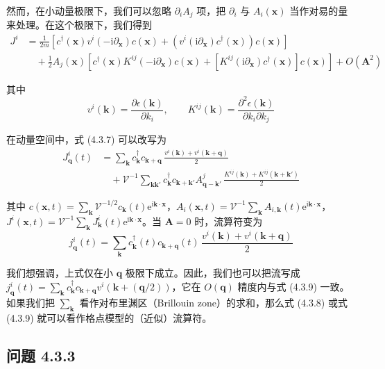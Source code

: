 然而，在小动量极限下，我们可以忽略 $\partial_iA_j$ 项，把 $\partial_i$ 与 $A_i(\pmb{x})$ 当作对易的量来处理。在这个极限下，我们得到
\begin{align*}
J^i &= \frac{1}{2m}\left[c^{\dagger}(\pmb{x})v^i(-\mathrm{i}\partial_{\pmb{x}})c(\pmb{x}) + \left(v^i(\mathrm{i}\partial_{\pmb{x}})c^{\dagger}(\pmb{x})\right)c(\pmb{x})\right] \tag{4.3.7}\\
&\quad + \frac{1}{2}A_j(\pmb{x})\left[c^{\dagger}(\pmb{x})K^{ij}(-\mathrm{i}\partial_{\pmb{x}})c(\pmb{x}) + \left[K^{ij}(\mathrm{i}\partial_{\pmb{x}})c^{\dagger}(\pmb{x})\right]c(\pmb{x})\right] + O(\pmb{A}^2)
\end{align*}

其中
\begin{equation*}
v^i(\pmb{k}) = \frac{\partial\epsilon(\pmb{k})}{\partial k_i}, \qquad K^{ij}(\pmb{k}) = \frac{\partial^2\epsilon(\pmb{k})}{\partial k_i\partial k_j}
\end{equation*}

在动量空间中，式 (4.3.7) 可以改写为
\begin{align*}
J^i_{\pmb{q}}(t) &= \sum_{\pmb{k}} c^{\dagger}_{\pmb{k}}c_{\pmb{k}+\pmb{q}}\,\frac{v^i(\pmb{k})+v^i(\pmb{k}+\pmb{q})}{2}\\
&\quad + \mathcal{V}^{-1}\sum_{\pmb{k}\pmb{k}'} c^{\dagger}_{\pmb{k}}c_{\pmb{k}+\pmb{k}'}A^j_{\pmb{q}-\pmb{k}'}\,\frac{K^{ij}(\pmb{k})+K^{ij}(\pmb{k}+\pmb{k}')}{2} \tag{4.3.8}
\end{align*}

其中 $c(\pmb{x},t)=\sum_{\pmb{k}}\mathcal{V}^{-1/2}c_{\pmb{k}}(t)\mathrm{e}^{\mathrm{i}\pmb{k}\cdot\pmb{x}}$，$A_i(\pmb{x},t)=\mathcal{V}^{-1}\sum_{\pmb{k}}A_{i,\pmb{k}}(t)\mathrm{e}^{\mathrm{i}\pmb{k}\cdot\pmb{x}}$，$J^i(\pmb{x},t)=\mathcal{V}^{-1}\sum_{\pmb{k}}J^i_{\pmb{k}}(t)\mathrm{e}^{\mathrm{i}\pmb{k}\cdot\pmb{x}}$。当 $\pmb{A}=0$ 时，流算符变为
\begin{equation*}
j^i_{\pmb{q}}(t) = \sum_{\pmb{k}} c^{\dagger}_{\pmb{k}}(t)c_{\pmb{k}+\pmb{q}}(t)\,\frac{v^i(\pmb{k})+v^i(\pmb{k}+\pmb{q})}{2} \tag{4.3.9}
\end{equation*}

我们想强调，上式仅在小 $\pmb{q}$ 极限下成立。因此，我们也可以把流写成 $j^i_{\pmb{q}}(t)=\sum_{\pmb{k}}c^{\dagger}_{\pmb{k}}c_{\pmb{k}+\pmb{q}}v^i(\pmb{k}+(\pmb{q}/2))$，它在 $O(\pmb{q})$ 精度内与式 (4.3.9) 一致。如果我们把 $\sum_{\pmb{k}}$ 看作对布里渊区（Brillouin zone）的求和，那么式 (4.3.8) 或式 (4.3.9) 就可以看作格点模型的（近似）流算符。

\subsection*{问题 4.3.3}

